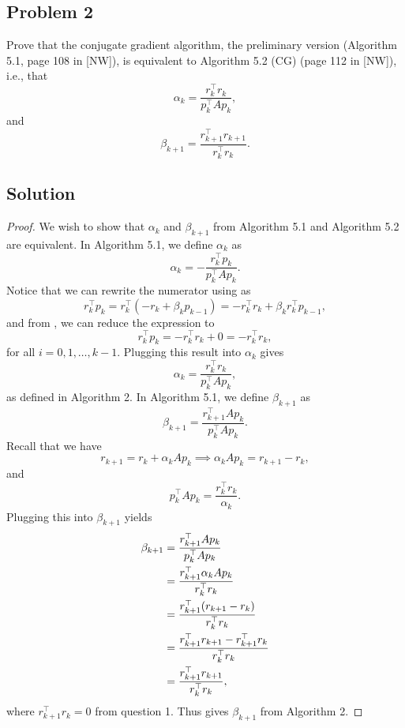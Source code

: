 \documentclass[12pt]{report}
\begin{document}


\begin{problem}%
\subsection*{Problem 2}

Prove that the conjugate gradient algorithm, the preliminary version (Algorithm 5.1, page 108 in [NW]), is equivalent to Algorithm 5.2 (CG) (page 112 in [NW]), i.e., that
\[
     \alpha_k = \frac{r_k^\top r_k}{p_k^\top A p_k},
\]
and
\[
     \beta_{k+1} = \frac{r_{k+1}^\top r_{k+1}}{r_k^\top r_k}.
\]



\subsection*{Solution}
\begin{proof}

We wish to show that $\alpha_k$ and $\beta_{k+1}$ from Algorithm 5.1 and Algorithm 5.2 are equivalent. In Algorithm 5.1, we define $\alpha_k$ as
\[
     \alpha_k = -\frac{r_k^\top p_k}{p_k^\top A p_k}.
\]
Notice that we can rewrite the numerator using  as
\[
     r_k^\top p_k = r_k^\top(-r_k + \beta_k p_{k-1}) = -r_k^\top r_k + \beta_k r_k^\top p_{k-1},
\]
and from , we can reduce the expression to
\[
     r_k^\top p_k = -r_k^\top r_k + 0 = -r_k^\top r_k,
\]
for all $i=0,1,\dots,k-1$. Plugging this result into $\alpha_k$ gives
\[
    \alpha_k = \frac{r_k^\top r_k}{p_k^\top A p_k},
\]
as defined in Algorithm 2. In Algorithm 5.1, we define $\beta_{k+1}$ as
\[
     \beta_{k+1} = \frac{r_{k+1}^\top A p_k}{p_k^\top A p_k}.
\]
Recall that we have
\[
     r_{k+1} = r_k + \alpha_k A p_k \implies \alpha_k Ap_k = r_{k+1} - r_k,
\]
and
\[
     p_k^\top Ap_k = \frac{r^\top_k r_k}{\alpha_k}.
\]
Plugging this into $\beta_{k+1}$ yields
\begin{align*}
    \beta_{k+1} &= \frac{r_{k+1}^\top A p_k}{p_k^\top A p_k}\\
    &= \frac{r_{k+1}^\top \alpha_k A p_k}{r^\top_k r_k}\\
    &= \frac{r_{k+1}^\top {\left(r_{k+1} - r_k\right)}}  {r^\top_k r_k}\\
    &= \frac{r_{k+1}^\top r_{k+1} - r_{k+1}^\top r_k}  {r^\top_k r_k}\\
    &= \frac{r_{k+1}^\top r_{k+1}}  {r^\top_k r_k},   
\end{align*}
where $r_{k+1}^\top r_k = 0$ from question 1. Thus gives $\beta_{k+1}$ from Algorithm 2.



\end{proof}
\end{problem}
\end{document}
